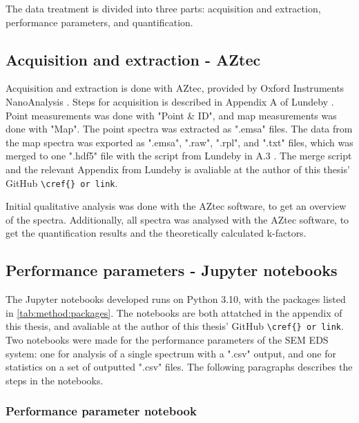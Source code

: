 The data treatment is divided into three parts: acquisition and extraction, performance parameters, and quantification.

\subsection{Acquisition and extraction - AZtec}
\label{method:data_treatment:aztec}

Acquisition and extraction is done with AZtec, provided by Oxford Instruments NanoAnalysis \cite{aztec_manual}.
Steps for acquisition is described in Appendix A of Lundeby \cite{lundeby_improving_2019}.
Point measurements was done with "Point \& ID", and map measurements was done with "Map".
The point spectra was extracted as ".emsa" files.
The data from the map spectra was exported as ".emsa", ".raw", ".rpl", and ".txt" files, which was merged to one ".hdf5" file with the script from Lundeby in A.3 \cite{lundeby_improving_2019}.
The merge script and the relevant Appendix from Lundeby is avaliable at the author of this thesis' GitHub \verb|\cref{} or link|.


Initial qualitative analysis was done with the AZtec software, to get an overview of the spectra.
Additionally, all spectra was analysed with the AZtec software, to get the quantification results and the theoretically calculated k-factors.



\subsection{Performance parameters - Jupyter notebooks}
\label{method:data_treatment:notebook}

The Jupyter notebooks developed runs on Python 3.10, with the packages listed in \cref{tab:method:packages}.
The notebooks are both attatched in the appendix of this thesis, and avaliable at the author of this thesis' GitHub \verb|\cref{} or link|.
Two notebooks were made for the performance parameters of the SEM EDS system: one for analysis of a single spectrum with a ".csv" output, and one for statistics on a set of outputted ".csv" files.
The following paragraphs describes the steps in the notebooks.




\subsubsection{Performance parameter notebook}
\label{method:data_treatment:notebook:performance}

